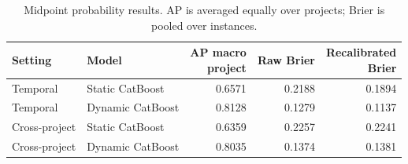 \begin{table}[htbp]
\centering\footnotesize\setlength{\tabcolsep}{4pt}
\caption{Midpoint probability results. AP is averaged equally over projects; Brier is pooled over instances.}\label{tab:04_probability}
\begin{tabular}{@{}llrrr@{}}
\toprule
Setting & Model & \shortstack{AP macro\\project} & Raw Brier & \shortstack{Recalibrated\\Brier} \\
\midrule
Temporal & Static CatBoost & 0.6571 & 0.2188 & 0.1894 \\
Temporal & Dynamic CatBoost & 0.8128 & 0.1279 & 0.1137 \\
Cross-project & Static CatBoost & 0.6359 & 0.2257 & 0.2241 \\
Cross-project & Dynamic CatBoost & 0.8035 & 0.1374 & 0.1381 \\
\bottomrule
\end{tabular}
\end{table}
